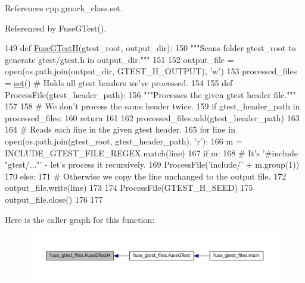 References cpp.\+gmock\+\_\+class.\+set.



Referenced by Fuse\+G\+Test().


\begin{DoxyCode}
149 \textcolor{keyword}{def }\hyperlink{namespacefuse__gtest__files_a95685ab66129ced9d7b3db78e6001c8b}{FuseGTestH}(gtest\_root, output\_dir):
150   \textcolor{stringliteral}{"""Scans folder gtest\_root to generate gtest/gtest.h in output\_dir."""}
151 
152   output\_file = open(os.path.join(output\_dir, GTEST\_H\_OUTPUT), \textcolor{stringliteral}{'w'})
153   processed\_files = \hyperlink{namespacecpp_1_1gmock__class_a2157e96eee0b4bf9ca6d195ab76f59c2}{set}()  \textcolor{comment}{# Holds all gtest headers we've processed.}
154 
155   \textcolor{keyword}{def }ProcessFile(gtest\_header\_path):
156     \textcolor{stringliteral}{"""Processes the given gtest header file."""}
157 
158     \textcolor{comment}{# We don't process the same header twice.}
159     \textcolor{keywordflow}{if} gtest\_header\_path \textcolor{keywordflow}{in} processed\_files:
160       \textcolor{keywordflow}{return}
161 
162     processed\_files.add(gtest\_header\_path)
163 
164     \textcolor{comment}{# Reads each line in the given gtest header.}
165     \textcolor{keywordflow}{for} line \textcolor{keywordflow}{in} open(os.path.join(gtest\_root, gtest\_header\_path), \textcolor{stringliteral}{'r'):}
166 \textcolor{stringliteral}{      m = INCLUDE\_GTEST\_FILE\_REGEX.match(line)}
167 \textcolor{stringliteral}{      }\textcolor{keywordflow}{if} m:
168         \textcolor{comment}{# It's '#include "gtest/..."' - let's process it recursively.}
169         ProcessFile(\textcolor{stringliteral}{'include/'} + m.group(1))
170       \textcolor{keywordflow}{else}:
171         \textcolor{comment}{# Otherwise we copy the line unchanged to the output file.}
172         output\_file.write(line)
173 
174   ProcessFile(GTEST\_H\_SEED)
175   output\_file.close()
176 
177 
\end{DoxyCode}
Here is the caller graph for this function\+:
\nopagebreak
\begin{figure}[H]
\begin{center}
\leavevmode
\includegraphics[width=350pt]{namespacefuse__gtest__files_a95685ab66129ced9d7b3db78e6001c8b_icgraph}
\end{center}
\end{figure}
\mbox{\label{namespacefuse__gtest__files_a5eaf924c10970f574e1b0459cbbda75a}} 

